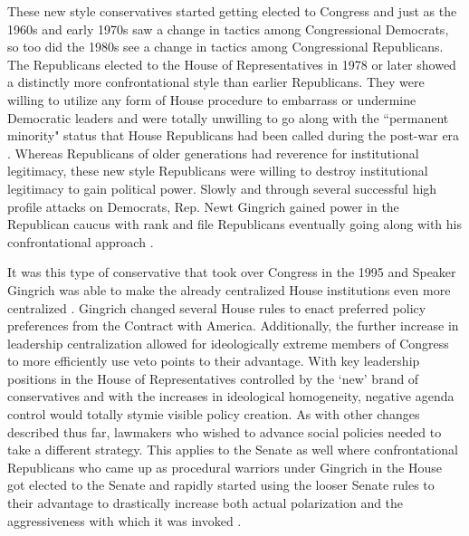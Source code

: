 \documentclass[12pt]{article}
\begin{document}
These new style conservatives started getting elected to Congress and just as the 1960s and early 1970s saw a change in tactics among Congressional Democrats, so too did the 1980s see a change in tactics among Congressional Republicans. The Republicans elected to the House of Representatives in 1978 or later showed a distinctly more confrontational style than earlier Republicans. They were willing to utilize any form of House procedure to embarrass or undermine Democratic leaders and were totally unwilling to go along with the ``permanent minority" status that House Republicans had been called during the post-war era \citep{theriault2013}. Whereas Republicans of older generations had reverence for institutional legitimacy, these new style Republicans were willing to destroy institutional legitimacy to gain political power. Slowly and through several successful high profile attacks on Democrats, Rep. Newt Gingrich gained power in the Republican caucus with rank and file Republicans eventually going along with his confrontational approach \citep{harris2006}. 

It was this type of conservative that took over Congress in the 1995 and Speaker Gingrich was able to make the already centralized House institutions even more centralized \citep{roberts2003}. Gingrich changed several House rules to enact preferred policy preferences from the Contract with America. Additionally, the further increase in leadership centralization allowed for ideologically extreme members of Congress to more efficiently use veto points to their advantage. With key leadership positions in the House of Representatives controlled by the `new' brand of conservatives and with the increases in ideological homogeneity, negative agenda control would totally stymie visible policy creation. As with other changes described thus far, lawmakers who wished to advance social policies needed to take a different strategy. This applies to the Senate as well where confrontational Republicans who came up as procedural warriors under Gingrich in the House got elected to the Senate and rapidly started using the looser Senate rules to their advantage to drastically increase both actual polarization and the aggressiveness with which it was invoked \citep{lee2008, theriault2013}.
\end{document}
